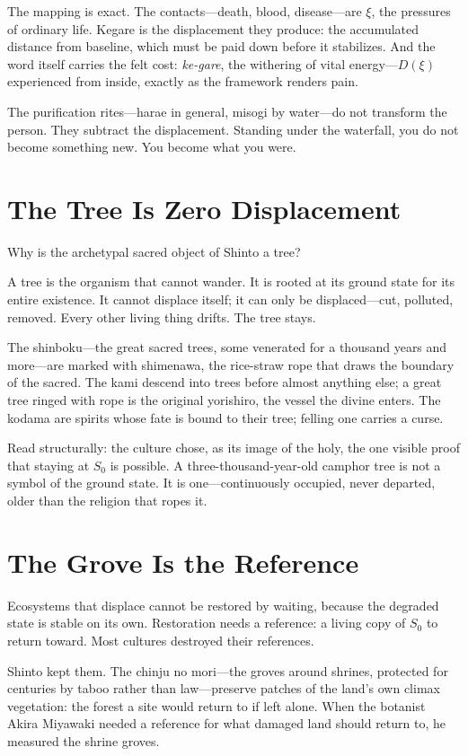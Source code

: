 \documentclass[12pt]{article}
\begin{document}
The mapping is exact. The contacts---death, blood, disease---are $\xi$, the pressures of ordinary life. Kegare is the displacement they produce: the accumulated distance from baseline, which must be paid down before it stabilizes. And the word itself carries the felt cost: \emph{ke-gare}, the withering of vital energy---$D(\xi)$ experienced from inside, exactly as the framework renders pain.

The purification rites---harae in general, misogi by water---do not transform the person. They subtract the displacement. Standing under the waterfall, you do not become something new. You become what you were.

\section{The Tree Is Zero Displacement}

Why is the archetypal sacred object of Shinto a tree?

A tree is the organism that cannot wander. It is rooted at its ground state for its entire existence. It cannot displace itself; it can only be displaced---cut, polluted, removed. Every other living thing drifts. The tree stays.

The shinboku---the great sacred trees, some venerated for a thousand years and more---are marked with shimenawa, the rice-straw rope that draws the boundary of the sacred. The kami descend into trees before almost anything else; a great tree ringed with rope is the original yorishiro, the vessel the divine enters. The kodama are spirits whose fate is bound to their tree; felling one carries a curse.

Read structurally: the culture chose, as its image of the holy, the one visible proof that staying at $S_0$ is possible. A three-thousand-year-old camphor tree is not a symbol of the ground state. It is one---continuously occupied, never departed, older than the religion that ropes it.

\section{The Grove Is the Reference}

Ecosystems that displace cannot be restored by waiting, because the degraded state is stable on its own. Restoration needs a reference: a living copy of $S_0$ to return toward. Most cultures destroyed their references.

Shinto kept them. The chinju no mori---the groves around shrines, protected for centuries by taboo rather than law---preserve patches of the land's own climax vegetation: the forest a site would return to if left alone. When the botanist Akira Miyawaki needed a reference for what damaged land should return to, he measured the shrine groves.
\end{document}
